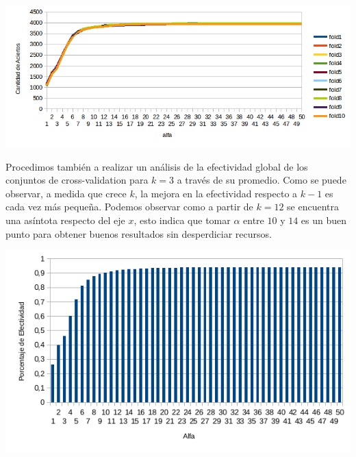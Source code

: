 \begin{center}
\includegraphics[scale=0.6]{nuevosResultados/pca/alfa/1.png}
\end{center}
Procedimos también a realizar un análisis de la efectividad global de los conjuntos de cross-validation para $k=3$ a través de su promedio. Como se puede observar, a medida que crece $k$, la mejora en la efectividad respecto a $k-1$ es cada vez más pequeña. Podemos observar como a partir de $k=12$ se encuentra una asíntota respecto del eje $x$, esto indica que tomar $\alpha$ entre $10$ y $14$ es un buen punto para obtener buenos resultados sin desperdiciar recursos.

\begin{center}
\includegraphics[scale=0.6]{nuevosResultados/alfaconk=3.png}\\
\end{center}

